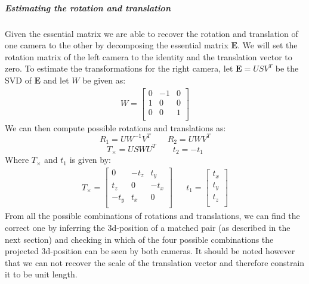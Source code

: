 \documentclass{paper}
\begin{document}
\subparagraph{Estimating the rotation and translation}
Given the essential matrix we are able to recover the rotation and translation of one camera to the other by decomposing the essential matrix $\mathbf{E}$. We will set the rotation matrix of the left camera to the identity and the translation vector to zero.
To estimate the transformations for the right camera, let $\mathbf{E}=USV^T$ be the SVD of $\mathbf{E}$ and let $W$ be given as:
\begin{align}
W= \left[ \begin{array}{ccc}
0 & -1 & 0\\
1 & 0 & 0 \\
0 & 0 & 1 \\
\end{array} \right] \nonumber 
\end{align}
We can then compute possible rotations and translations as:
\begin{equation} 
R_1 = UW^{-1}V^T
\qquad
R_2 = UWV^T
\end{equation}
\begin{equation} 
T_\times = USWU^T
\qquad
t_2 = -t_1
\end{equation}
Where $T_\times$ and $t_1$ is given by:
\begin{align}
T_\times = \left[ \begin{array}{ccc}
0 & -t_z & t_y\\
t_z & 0 & -t_x \\
-t_y & t_x & 0 \\
\end{array} \right] \nonumber 
&& t_1= \left[ \begin{array}{c}
t_x\\
t_y \\
t_z \\
\end{array} \right] \nonumber 
\end{align}
From all the possible combinations of rotations and translations, we can find the correct one by inferring the 3d-position of a matched pair (as described in the next section) and checking in which of the four possible combinations the projected 3d-position can be seen by both cameras. It should be noted however that we can not recover the scale of the translation vector and therefore constrain it to be unit length.
\end{document}
